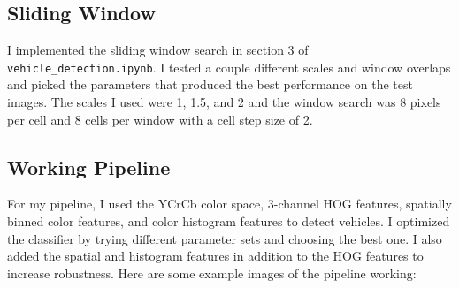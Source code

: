 \documentclass[12pt]{article}
\begin{document}
\subsection{Sliding Window}
I implemented the sliding window search in section 3 of \texttt{vehicle\_detection.ipynb}. I tested a couple different scales and window overlaps and picked the parameters that produced the best performance on the test images. The scales I used were 1, 1.5, and 2 and the window search was 8 pixels per cell and 8 cells per window with a cell step size of 2.

\subsection{Working Pipeline}
For my pipeline, I used the YCrCb color space, 3-channel HOG features, spatially binned color features, and color histogram features to detect vehicles. I optimized the classifier by trying different parameter sets and choosing the best one. I also added the spatial and histogram features in addition to the HOG features to increase robustness. Here are some example images of the pipeline working:
\end{document}
